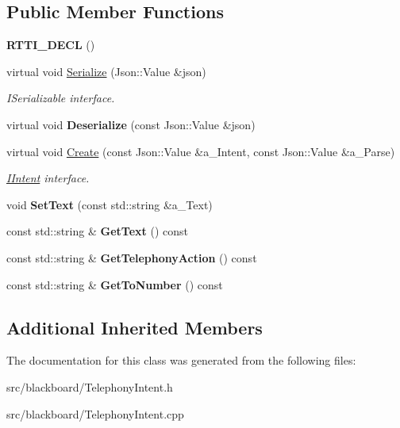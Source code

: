 \subsection*{Public Member Functions}
\begin{DoxyCompactItemize}
\item 
\mbox{\label{class_telephony_intent_a5f95587ff8034da65d633e6fd2bdb205}} 
{\bfseries R\+T\+T\+I\+\_\+\+D\+E\+CL} ()
\item 
\mbox{\label{class_telephony_intent_a32f49f856895864ea8c94de00f97577f}} 
virtual void \hyperlink{class_telephony_intent_a32f49f856895864ea8c94de00f97577f}{Serialize} (Json\+::\+Value \&json)
\begin{DoxyCompactList}\small\item\em I\+Serializable interface. \end{DoxyCompactList}\item 
\mbox{\label{class_telephony_intent_a94a189748a074c0e3577014d842798a2}} 
virtual void {\bfseries Deserialize} (const Json\+::\+Value \&json)
\item 
\mbox{\label{class_telephony_intent_adf746d6b7cf81b325392cf3dca4f566f}} 
virtual void \hyperlink{class_telephony_intent_adf746d6b7cf81b325392cf3dca4f566f}{Create} (const Json\+::\+Value \&a\+\_\+\+Intent, const Json\+::\+Value \&a\+\_\+\+Parse)
\begin{DoxyCompactList}\small\item\em \hyperlink{class_i_intent}{I\+Intent} interface. \end{DoxyCompactList}\item 
\mbox{\label{class_telephony_intent_ae9fefc77872cb690a1c92308a6a371e1}} 
void {\bfseries Set\+Text} (const std\+::string \&a\+\_\+\+Text)
\item 
\mbox{\label{class_telephony_intent_aab892aca8410394f94499c576eec8dab}} 
const std\+::string \& {\bfseries Get\+Text} () const
\item 
\mbox{\label{class_telephony_intent_a72b16ae655b52d9486e6fa18b6b3fde3}} 
const std\+::string \& {\bfseries Get\+Telephony\+Action} () const
\item 
\mbox{\label{class_telephony_intent_afadb428df1fef956aae13bd605ae80f0}} 
const std\+::string \& {\bfseries Get\+To\+Number} () const
\end{DoxyCompactItemize}
\subsection*{Additional Inherited Members}


The documentation for this class was generated from the following files\+:\begin{DoxyCompactItemize}
\item 
src/blackboard/Telephony\+Intent.\+h\item 
src/blackboard/Telephony\+Intent.\+cpp\end{DoxyCompactItemize}
